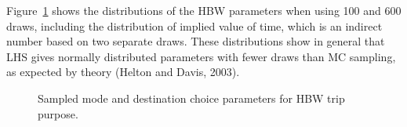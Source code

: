 \documentclass[
  futuretransp,
  submit,
  moreauthors,
]{Definitions/mdpi}
\begin{document}
Figure~\ref{fig-parameter} shows the distributions of the HBW
parameters when using 100 and 600 draws, including the distribution of implied 
value of time, which is an indirect number based on two separate draws.
These distributions show in general that LHS gives normally distributed parameters with fewer draws than MC
sampling, as expected by theory (Helton and Davis, 2003).

\begin{figure}

\begin{minipage}{\linewidth}



\end{minipage}%
\newline
\begin{minipage}{\linewidth}



\end{minipage}%

\caption{\label{fig-parameter}Sampled mode and destination choice
parameters for HBW trip purpose.}

\end{figure}%
\end{document}
